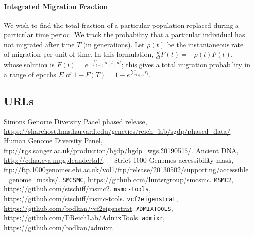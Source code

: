\documentclass{article}
\begin{document}
\paragraph{Integrated Migration Fraction}
We wish to find the total fraction of a particular population replaced during a particular time period. We track the probability that a particular individual has not migrated after time $T$ (in generations). Let $\rho(t)$ be the instantaneous rate of migration per unit of time. In this formulation, $\frac{d}{dt} F(t) = - \rho(t) F(t)$, whose solution is $F(t) = e^{- \int_{t=0}^T \rho(t) dt}$; this gives a total migration probability in a range of epochs $E$ of  $1-F(T) = 1 - e^{\sum_{i \in E} r_i}$. 

\subsection*{URLs}
{Simons Genome Diversity Panel phased release}, \url{https://sharehost.hms.harvard.edu/genetics/reich_lab/sgdp/phased_data/}.
{Human Genome Diversity Panel}, \url{ftp://ngs.sanger.ac.uk/production/hgdp/hgdp_wgs.20190516/}.
{Ancient DNA},~~ \url{http://cdna.eva.mpg.deandertal/}.~~
{Strict 1000 Genomes accessibility mask}, \url{ftp://ftp.1000genomes.ebi.ac.uk/vol1/ftp/release/20130502/supporting/accessible_genome_masks/}.
{{\tt SMCSMC}}, \url{https://github.com/luntergroup/smcsmc}.
{{\tt MSMC2}}, \url{https://github.com/stschiff/msmc2}.
{{\tt msmc-tools}}, \url{https://github.com/stschiff/msmc-tools}.
{\tt vcf2eigenstrat}, \url{https://github.com/bodkan/vcf2eigenstrat}.
{\tt ADMIXTOOLS}, \url{https://github.com/DReichLab/AdmixTools}.
{\tt admixr}, \url{https://github.com/bodkan/admixr}.




\end{document}
